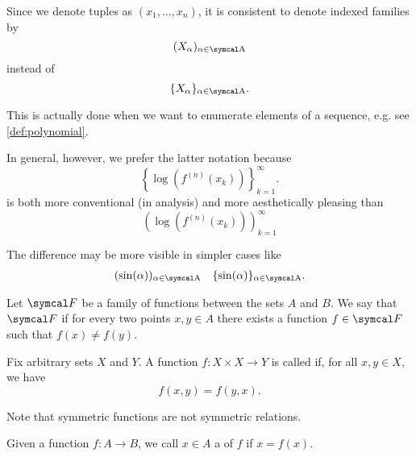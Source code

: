 \begin{remark}\label{remark:indexed_family_notation}
  Since we denote tuples as \( (x_1, \ldots, x_n) \), it is consistent to denote indexed families by
  \begin{equation*}
    ( X_\al )_{\al \in \CA}
  \end{equation*}
  instead of
  \begin{equation*}
    \{ X_\al \}_{\al \in \CA}.
  \end{equation*}

  This is actually done when we want to enumerate elements of a sequence, e.g. see \cref{def:polynomial}.

  In general, however, we prefer the latter notation because
  \begin{equation*}
    \left\{ \log \left( f^{(n)}(x_k) \right) \right\}_{k=1}^\infty.
  \end{equation*}
  is both more conventional (in analysis) and more aesthetically pleasing than
  \begin{equation*}
    \left( \log \left( f^{(n)}(x_k) \right) \right)_{k=1}^\infty
  \end{equation*}

  The difference may be more visible in simpler cases like
  \begin{align*}
    (\sin(\al))_{\al \in \CA}
    &&
    \{\sin(\al)\}_{\al \in \CA}.
  \end{align*}
\end{remark}

\begin{definition}\label{def:family_of_functions_separates_points}
  Let \( \Cal{F} \) be a family of functions between the sets \( A \) and \( B \). We say that \( \Cal{F} \)  if for every two points \( x, y \in A \) there exists a function \( f \in \Cal{F} \) such that \( f(x) \neq f(y) \).
\end{definition}

\begin{definition}\label{def:symmetric_function}
  Fix arbitrary sets \( X \) and \( Y \). A function \( f: X \times X \to Y \) is called  if, for all \( x, y \in X \), we have
  \begin{equation*}
    f(x, y) = f(y, x).
  \end{equation*}

  Note that symmetric functions are not symmetric relations.
\end{definition}

\begin{definition}\label{def:fixed_point}
  Given a function \( f: A \to B \), we call \( x \in A \) a  of \( f \) if \( x = f(x) \).
\end{definition}
